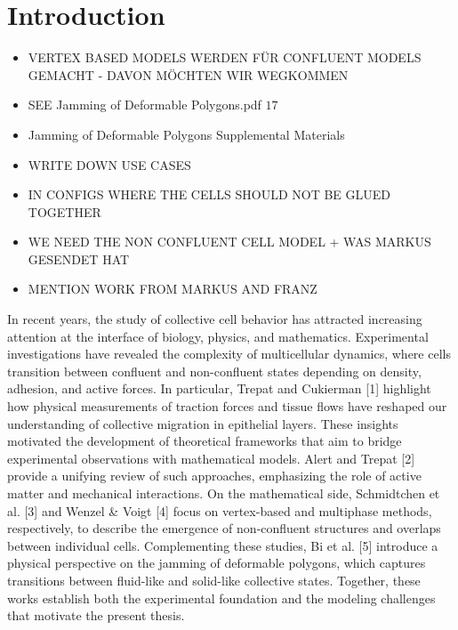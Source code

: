 \section{Introduction}

\begin{itemize}
    \item VERTEX BASED MODELS WERDEN FÜR CONFLUENT MODELS GEMACHT - DAVON MÖCHTEN WIR WEGKOMMEN 
    \item SEE Jamming of Deformable Polygons.pdf $17$ 
    \item Jamming of Deformable Polygons Supplemental Materials
    \item WRITE DOWN USE CASES 
    \item IN CONFIGS WHERE THE CELLS SHOULD NOT BE GLUED TOGETHER
    \item WE NEED THE NON CONFLUENT CELL MODEL + WAS MARKUS GESENDET HAT 
    \item MENTION WORK FROM MARKUS AND FRANZ 
\end{itemize}

In recent years, the study of collective cell behavior has attracted increasing attention at the interface of biology, physics, and mathematics. 
Experimental investigations have revealed the complexity of multicellular dynamics, where cells transition between confluent and non-confluent states depending on density, adhesion, and active forces. 
In particular, Trepat and Cukierman [1] highlight how physical measurements of traction forces and tissue flows have reshaped our understanding of collective migration in epithelial layers. 
These insights motivated the development of theoretical frameworks that aim to bridge experimental observations with mathematical models. 
Alert and Trepat [2] provide a unifying review of such approaches, emphasizing the role of active matter and mechanical interactions. 
On the mathematical side, Schmidtchen et al. [3] and Wenzel & Voigt [4] focus on vertex-based and multiphase methods, respectively, to describe the emergence of non-confluent structures and overlaps between individual cells. 
Complementing these studies, Bi et al. [5] introduce a physical perspective on the jamming of deformable polygons, which captures transitions between fluid-like and solid-like collective states. 
Together, these works establish both the experimental foundation and the modeling challenges that motivate the present thesis.

